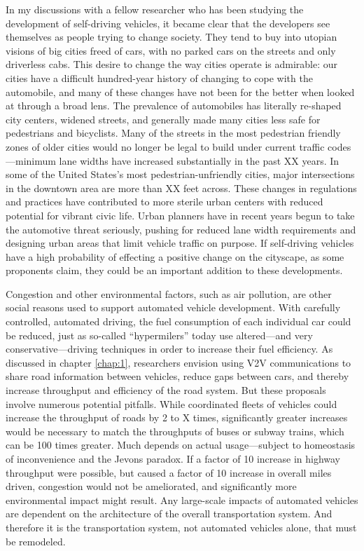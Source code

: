 In my discussions with a fellow researcher who has been studying the
development of self-driving vehicles, it became clear that the
developers see themselves as people trying to change society. They
tend to buy into utopian visions of big cities freed of cars, with no
parked cars on the streets and only driverless cabs. This desire to
change the way cities operate is admirable: our cities have a
difficult hundred-year history of changing to cope with the
automobile, and many of these changes have not been for the better
when looked at through a broad lens. The prevalence of automobiles has
literally re-shaped city centers,\cite{???-kemp} widened
streets,\cite{???-kemp} and generally made many cities less safe for
pedestrians and bicyclists. Many of the streets in the most pedestrian
friendly zones of older cities would no longer be legal to build under
current traffic codes---minimum lane widths have increased
substantially in the past XX years.\cite{???-kemp} In some of the
United States's most pedestrian-unfriendly cities, major intersections
in the downtown area are more than XX feet across. These changes in
regulations and practices have contributed to more sterile urban
centers with reduced potential for vibrant civic life. Urban planners have
in recent years begun to take the automotive threat seriously, pushing
for reduced lane width requirements and designing urban areas that
limit vehicle traffic on purpose.\cite{???-kemp} If self-driving
vehicles have a high probability of effecting a positive change on the
cityscape, as some proponents claim, they could be an important
addition to these developments.

Congestion and other environmental factors, such as air pollution, are
other social reasons used to support automated vehicle development.
With carefully controlled, automated driving, the fuel consumption of each
individual car could be reduced, just as so-called ``hypermilers''
today use altered---and very conservative---driving techniques in
order to increase their fuel efficiency.\cite{???} As discussed in
chapter \ref{chap:1}, researchers envision using V2V communications to
share road information between vehicles, reduce gaps between cars, and
thereby increase throughput and efficiency of the road system. But
these proposals involve numerous potential pitfalls. While coordinated
fleets of vehicles could increase the throughput of roads by 2 to X
times, significantly greater increases would be necessary to match the
throughputs of buses or subway trains, which can be 100 times
greater.\cite{???-kemp} Much depends on actual usage---subject to
homeostasis of inconvenience and the Jevons paradox. If a factor of 10
increase in highway throughput were possible, but caused a factor of
10 increase in overall miles driven, congestion would not be
ameliorated, and significantly more environmental impact might result. Any
large-scale impacts of automated vehicles are dependent on the
architecture of the overall transportation system. And therefore it is
the transportation system, not automated vehicles alone, that must be remodeled.

